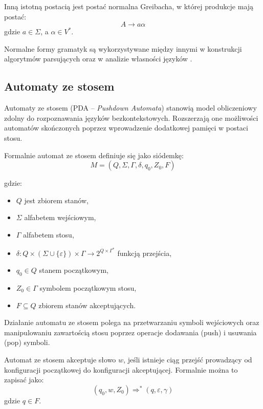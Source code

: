 \documentclass[12pt]{article}
\begin{document}
Inną istotną postacią jest postać normalna Greibacha, w której produkcje mają postać:
\begin{equation}
A \rightarrow a\alpha
\end{equation}
gdzie $a \in \Sigma$, a $\alpha \in V^*$.

Normalne formy gramatyk są wykorzystywane między innymi w konstrukcji algorytmów parsujących oraz w analizie własności języków \cite{hopcroft2007,aho1972}.

\subsection{Automaty ze stosem}

Automaty ze stosem (PDA -- \textit{Pushdown Automata}) stanowią model obliczeniowy zdolny do rozpoznawania języków bezkontekstowych. Rozszerzają one możliwości automatów skończonych poprzez wprowadzenie dodatkowej pamięci w postaci stosu.

Formalnie automat ze stosem definiuje się jako siódemkę:
\begin{equation}
M = (Q, \Sigma, \Gamma, \delta, q_0, Z_0, F)
\end{equation}

gdzie:
\begin{itemize}
    \item $Q$ jest zbiorem stanów,
    \item $\Sigma$ alfabetem wejściowym,
    \item $\Gamma$ alfabetem stosu,
    \item $\delta: Q \times (\Sigma \cup \{\varepsilon\}) \times \Gamma \rightarrow 2^{Q \times \Gamma^*}$ funkcją przejścia,
    \item $q_0 \in Q$ stanem początkowym,
    \item $Z_0 \in \Gamma$ symbolem początkowym stosu,
    \item $F \subseteq Q$ zbiorem stanów akceptujących.
\end{itemize}

Działanie automatu ze stosem polega na przetwarzaniu symboli wejściowych oraz manipulowaniu zawartością stosu poprzez operacje dodawania (push) i usuwania (pop) symboli.

Automat ze stosem akceptuje słowo $w$, jeśli istnieje ciąg przejść prowadzący od konfiguracji początkowej do konfiguracji akceptującej. Formalnie można to zapisać jako:
\begin{equation}
(q_0, w, Z_0) \Rightarrow^* (q, \varepsilon, \gamma)
\end{equation}
gdzie $q \in F$.
\end{document}
